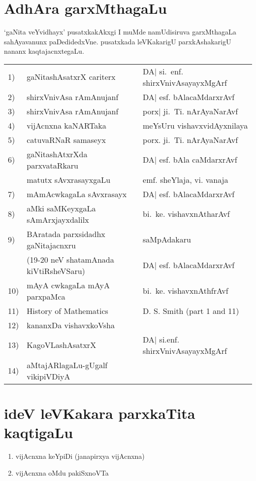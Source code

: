 {\section*{AdhAra garxMthagaLu}

`gaNita veYvidhayx' pusatxkakAkxgi I muMde namUdisiruva garxMthagaLa sahAyavanunx paDedidedxVne. pusatxkada leVKakarigU parxkAshakarigU nananx kaqtajacnxtegaLu.

\begin{longtable}{l>{\raggedright}p{4cm}>{\raggedright}p{4cm}}
{\rm 1)} &  gaNitashAsatxrX cariterx & DA| si.~enf. shirxVnivAsayayxMgArf \tabularnewline
{\rm 2)} & shirxVnivAsa rAmAnujanf & DA| esf. bAlacaMdarxrAvf\tabularnewline
{\rm 3)} & shirxVnivAsa rAmAnujanf & porx| ji.~Ti. nArAyaNarAvf\tabularnewline
{\rm 4)} & vijAcnxna kaNARTaka & meYsUru vishavxvidAyxnilaya\tabularnewline
{\rm 5)} & catuvaRNaR samaseyx & porx. ji.~Ti. nArAyaNarAvf\tabularnewline
{\rm 6)} & gaNitashAtxrXda parxvataRkaru & DA| esf. bAla caMdarxrAvf\tabularnewline[-0.1cm]
& matutx sAvxrasayxgaLu & emf. sheYlaja, vi. vanaja\tabularnewline
{\rm 7)} & mAmAcwkagaLa sAvxrasayx & DA| esf. bAlacaMdarxrAvf\tabularnewline
{\rm 8)} & aMki saMKeyxgaLa sAmArxjayxdalilx & bi.~ke. vishavxnAtharAvf\tabularnewline
{\rm 9)} & BAratada parxsidadhx gaNitajacnxru  & saMpAdakaru \tabularnewline[-0.1cm]
& ({\rm 19-20} neV shatamAnada kiVtiRsheVSaru) & DA| esf. bAlacaMdarxrAvf\tabularnewline
{\rm 10)} & mAyA cwkagaLa mAyA parxpaMca & bi.~ke. vishavxnAthfrAvf\tabularnewline
{\rm 11)} & {\rm History of Mathematics} & {\rm D. S. Smith (part 1 and 11)}\tabularnewline[-0.1cm]
{\rm 12)} & kananxDa vishavxkoVsha &\tabularnewline
{\rm 13)} & KagoVLashAsatxrX & DA| si.enf. shirxVnivAsayayxMgArf\tabularnewline
{\rm 14)} & aMtajARlagaLu-gUgalf vikipiVDiyA & \tabularnewline
\end{longtable}

\section*{ideV leVKakara parxkaTita kaqtigaLu}

\begin{enumerate}
\item vijAcnxna keYpiDi (janapirxya vijAcnxna)

\item vijAcnxna oMdu pakiSxnoVTa


\end{enumerate}}
